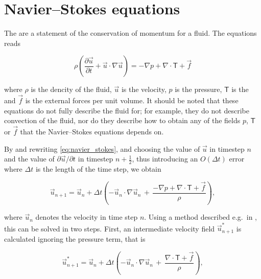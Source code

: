 \section{Navier--Stokes equations}

The  are a statement of the conservation of momentum for a fluid. The  equations reads

\begin{equation} \label{eq:navier_stokes}
\rho\left(\frac{\partial\vec{u}}{\partial t} + \vec{u}\cdot\nabla\vec{u}\right) = -\nabla p + \nabla\cdot\boldsymbol{\mathsf{T}} + \vec{f}
\end{equation}

where $\rho$ is the dencity of the fluid, $\vec{u}$ is the velocity, $p$ is the pressure, $\boldsymbol{\mathsf{T}}$ is the  and $\vec{f}$ is the external forces per unit volume. It should be noted that these equations do not fully describe the fluid for; for example, they do not describe convection of the fluid, nor do they describe how to obtain any of the fields $p$, $\boldsymbol{\mathsf{T}}$ or $\vec{f}$ that the Navier--Stokes equations depends on.

By  and rewriting \eqref{eq:navier_stokes}, and choosing the value of $\vec{u}$ in timestep $n$ and the value of $\partial\vec{u}/\partial t$ in timestep $n+\frac{1}{2}$, thus introducing an $O(\Delta t)$ error where $\Delta t$ is the length of the time step, we obtain

\begin{equation} \label{eq:navier_stokes_time_discretized}
\vec{u}_{n+1}  = \vec{u}_{n} + \Delta t\left(-\vec{u}_{n}\cdot\nabla\vec{u}_{n} \,+\, \frac{-\nabla p + \nabla\cdot\boldsymbol{\mathsf{T}} + \vec{f}}{\rho}\right),
\end{equation}

where $\vec{u}_{n}$ denotes the velocity in time step $n$. Using a method described e.g.\ in \citep{Losasso2004}, this \PDE can be solved in two steps. First, an intermediate velocity field $\vec{u}^*_{n+1}$ is calculated ignoring the pressure term, that is

\begin{equation} \label{eq:intermediate_velocity}
\vec{u}^*_{n+1}  = \vec{u}_{n} + \Delta t\left(-\vec{u}_{n}\cdot\nabla\vec{u}_{n} \,+\, \frac{\nabla\cdot\boldsymbol{\mathsf{T}} + \vec{f}}{\rho}\right),
\end{equation}

